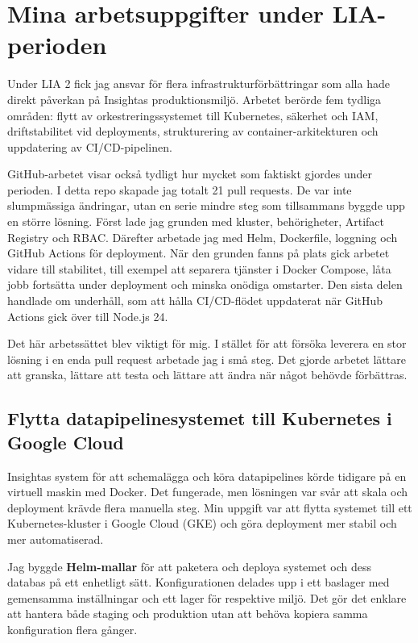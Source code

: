 \section{Mina arbetsuppgifter under LIA-perioden}
\label{sec:arbetsuppgifter}

Under LIA 2 fick jag ansvar för flera infrastrukturförbättringar som alla hade direkt påverkan
på Insightas produktionsmiljö. Arbetet berörde fem tydliga områden: flytt av
orkestreringssystemet till Kubernetes, säkerhet och IAM, driftstabilitet vid deployments,
strukturering av container-arkitekturen och uppdatering av CI/CD-pipelinen.

GitHub-arbetet visar också tydligt hur mycket som faktiskt gjordes under perioden. I detta repo
skapade jag totalt 21 pull requests. De var inte slumpmässiga ändringar, utan en serie mindre
steg som tillsammans byggde upp en större lösning. Först lade jag grunden med kluster,
behörigheter, Artifact Registry och RBAC. Därefter arbetade jag med Helm, Dockerfile,
loggning och GitHub Actions för deployment. När den grunden fanns på plats gick arbetet vidare
till stabilitet, till exempel att separera tjänster i Docker Compose, låta jobb fortsätta under
deployment och minska onödiga omstarter. Den sista delen handlade om underhåll, som att hålla
CI/CD-flödet uppdaterat när GitHub Actions gick över till Node.js 24.

Det här arbetssättet blev viktigt för mig. I stället för att försöka leverera en stor lösning i en
enda pull request arbetade jag i små steg. Det gjorde arbetet lättare att granska, lättare att
testa och lättare att ändra när något behövde förbättras.

\subsection{Flytta datapipelinesystemet till Kubernetes i Google Cloud}
\label{subsec:k8s}

Insightas system för att schemalägga och köra datapipelines körde tidigare på en virtuell
maskin med Docker. Det fungerade, men lösningen var svår att skala och deployment krävde
flera manuella steg. Min uppgift var att flytta systemet till ett Kubernetes-kluster i Google
Cloud (GKE) och göra deployment mer stabil och mer automatiserad.

Jag byggde \textbf{Helm-mallar} för att paketera och deploya systemet och dess databas på ett
enhetligt sätt. Konfigurationen delades upp i ett baslager med gemensamma inställningar och
ett lager för respektive miljö. Det gör det enklare att hantera både staging och produktion
utan att behöva kopiera samma konfiguration flera gånger.

